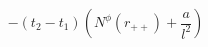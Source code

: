 \begin{equation}
-(t_2-t_1) \left(N^{\phi}(r_{++}) + \frac{a}{l^2}\right)
\label{a2}
\end{equation}


